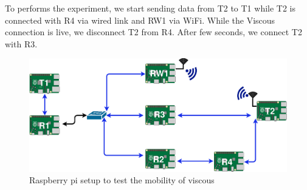 To performs the experiment, we start sending data from T2 to T1 while T2 is connected with R4 via wired link and RW1 via WiFi. While the Viscous connection is live, we disconnect T2 from R4. After few seconds, we connect T2 with R3. 
\begin{figure}
	\centering
	\includegraphics[width=.9\linewidth]{img/mobility/demo-Diagram.eps}
	\caption{\label{fig:mobility_diagram}Raspberry pi setup to test the mobility of viscous}
\end{figure}

